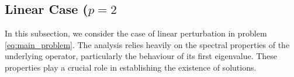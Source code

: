 \documentclass[11pt]{article}
\begin{document}
\subsection{Linear Case (\texorpdfstring{$p = 2$})}\label{sec:linear}
In this subsection, we consider the case of linear perturbation in problem \eqref{eq:main_problem}. The analysis relies heavily on the spectral properties of the underlying operator, particularly the behaviour of its first eigenvalue. These properties play a crucial role in establishing the existence of solutions.


\end{document}
